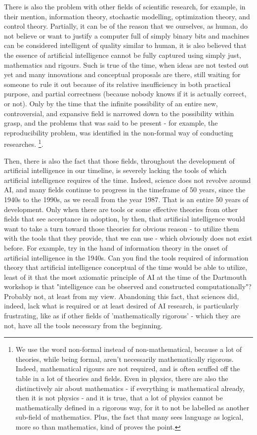 There is also the problem with other fields of scientific research, for example, in their mention, information theory, stochastic modelling, optimization theory, and control theory. Partially, it can be of the reason that we ourselves, as human, do not believe or want to justify a computer full of simply binary bits and machines can be considered intelligent of quality similar to human, it is also believed that the essence of artificial intelligence cannot be fully captured using simply just, mathematics and rigours. Such is true of the time, when ideas are not tested out yet and many innovations and conceptual proposals are there, still waiting for someone to rule it out because of its relative insufficiency in both practical purpose, and partial correctness (because nobody knows if it is actually correct, or not). Only by the time that the infinite possibility of an entire new, controversial, and expansive field is narrowed down to the possibility within grasp, and the problems that was said to be present - for example, the reproducibility problem, was identified in the non-formal way of conducting researches. \footnote{We use the word non-formal instead of non-mathematical, because a lot of theories, while being formal, aren't necessarily mathematically rigorous. Indeed, mathematical rigours are not required, and is often scuffed off the table in a lot of theories and fields. Even in physics, there are also the distinctively air about mathematics - if everything is mathematical already, then it is not physics - and it is true, that a lot of physics cannot be mathematically defined in a rigorous way, for it to not be labelled as another sub-field of mathematics. Plus, the fact that many sees language as logical, more so than mathematics, kind of proves the point.}. 

Then, there is also the fact that those fields, throughout the development of artificial intelligence in our timeline, is severely lacking the tools of which artificial intelligence requires of the time. Indeed, science does not revolve around AI, and many fields continue to progress in the timeframe of 50 years, since the 1940s to the 1990s, as we recall from the year 1987. That is an entire 50 years of development. Only when there are tools or some effective theories from other fields that see acceptance in adoption, by then, that artificial intelligence would want to take a turn toward those theories for obvious reason - to utilize them with the tools that they provide, that we can use - which obviously does not exist before. For example, try in the hand of information theory in the onset of artificial intelligence in the 1940s. Can you find the tools required of information theory that artificial intelligence conceptual of the time would be able to utilize, least of it that the most axiomatic principle of AI at the time of the Dartmouth workshop is that "intelligence can be observed and constructed computationally"? Probably not, at least from my view. Abandoning this fact, that sciences did, indeed, lack what is required or at least desired of AI research, is particularly frustrating, like as if other fields of 'mathematically rigorous' - which they are not, have all the tools necessary from the beginning. 

